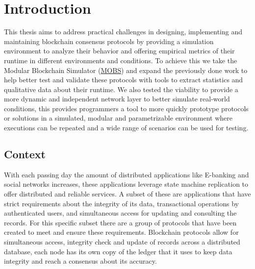 
%

\chapter{Introduction}\label{cha:introduction}

This thesis aims to address practical challenges in designing, implementing and maintaining blockchain consensus
protocols by providing a simulation environment to analyze their behavior and offering empirical metrics of their runtime in
different environments and conditions. To achieve this we take the Modular Blockchain Simulator (\href{https://github.com/mce-alves/MOBS
}{MOBS}) and expand the previously done work to help better test and validate these protocols with tools to extract statistics and 
qualitative data about their runtime. We also tested the viability to provide a more dynamic and independent network layer
to better simulate real-world conditions, this provides programmers a tool to more quickly prototype protocols or solutions
in a simulated, modular and parametrizable environment where executions can be repeated and a wide range of scenarios
can be used for testing.


\section{Context}\label{sub:context}
With each passing day the amount of distributed applications like E-banking and social networks increases, these applications
leverage state machine replication to offer distributed and reliable services. A subset of these are applications
that have strict requirements about the integrity of its data, transactional operations by authenticated users, 
and simultaneous access for updating and
consulting the records. For this specific subset there are a group of protocols that have been created to meet and ensure
these requirements. Blockchain protocols allow for simultaneous access, integrity check and update of records across
a distributed database, each node has its own copy of the ledger that it uses to keep data integrity and reach a consensus
about its accuracy.

